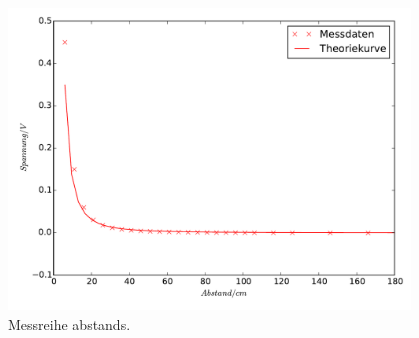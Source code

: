 \begin{figure}
  \centering
  \includegraphics[height=8cm]{LED.pdf}
  \caption{Messreihe abstands.}
  \label{fig:LED}
\end{figure}
